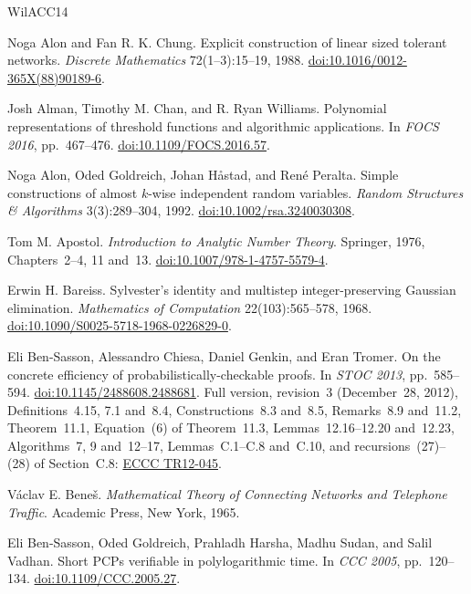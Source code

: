 \documentclass[11pt,letterpaper]{article}
\theoremstyle{definition}
\theoremstyle{remark}
\begin{document}
\clearpage
\begin{thebibliography}{WilACC14}
\raggedright

Noga Alon and Fan R. K. Chung. Explicit construction of linear sized
tolerant networks. \emph{Discrete Mathematics} 72(1--3):15--19, 1988.
\href{https://doi.org/10.1016/0012-365X(88)90189-6}{doi:10.1016/0012-365X(88)90189-6}.

Josh Alman, Timothy M. Chan, and R. Ryan Williams.
Polynomial representations of threshold functions and algorithmic
applications. In \emph{FOCS 2016}, pp.~467--476.
\href{https://doi.org/10.1109/FOCS.2016.57}{doi:10.1109/FOCS.2016.57}.

Noga Alon, Oded Goldreich, Johan H\aa{}stad, and Ren\'e Peralta.
Simple constructions of almost \(k\)-wise independent random variables.
\emph{Random Structures \& Algorithms} 3(3):289--304, 1992.
\href{https://doi.org/10.1002/rsa.3240030308}{doi:10.1002/rsa.3240030308}.

Tom M. Apostol. \emph{Introduction to Analytic Number Theory}.
Springer, 1976, Chapters~2--4, 11 and~13.
\href{https://doi.org/10.1007/978-1-4757-5579-4}{doi:10.1007/978-1-4757-5579-4}.

Erwin H. Bareiss. Sylvester's identity and multistep integer-preserving
Gaussian elimination. \emph{Mathematics of Computation}
22(103):565--578, 1968.
\href{https://doi.org/10.1090/S0025-5718-1968-0226829-0}{doi:10.1090/S0025-5718-1968-0226829-0}.

Eli Ben-Sasson, Alessandro Chiesa, Daniel Genkin, and Eran Tromer.
On the concrete efficiency of probabilistically-checkable proofs.
In \emph{STOC 2013}, pp.~585--594.
\href{https://doi.org/10.1145/2488608.2488681}{doi:10.1145/2488608.2488681}.
Full version, revision~3 (December~28, 2012), Definitions~4.15, 7.1
and~8.4, Constructions~8.3 and~8.5, Remarks~8.9 and~11.2, Theorem~11.1,
Equation~(6) of Theorem~11.3, Lemmas~12.16--12.20 and~12.23,
Algorithms~7, 9 and~12--17, Lemmas~C.1--C.8 and~C.10, and
recursions~(27)--(28) of Section~C.8:
\href{https://eccc.weizmann.ac.il/report/2012/045/}{ECCC TR12-045}.

V\'aclav E. Bene\v{s}. \emph{Mathematical Theory of Connecting Networks
and Telephone Traffic}. Academic Press, New York, 1965.

Eli Ben-Sasson, Oded Goldreich, Prahladh Harsha, Madhu Sudan,
and Salil Vadhan. Short PCPs verifiable in polylogarithmic time.
In \emph{CCC 2005}, pp.~120--134.
\href{https://doi.org/10.1109/CCC.2005.27}{doi:10.1109/CCC.2005.27}.


\end{thebibliography}
\end{document}
